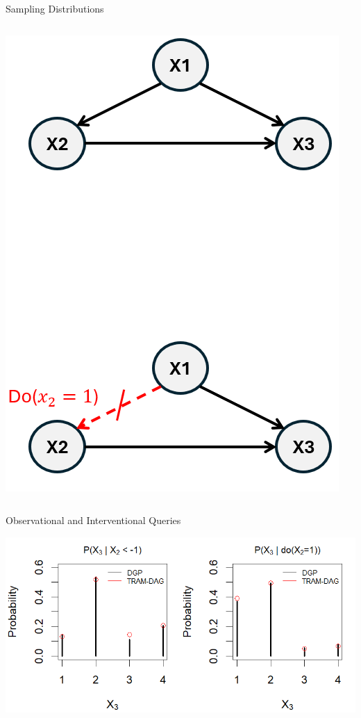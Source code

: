 \documentclass[onlytextwidth,english]{beamer}\usepackage[]{graphicx}\usepackage[]{xcolor}
\begin{document}
\begin{frame}{Sampling Distributions}
\begin{columns}
  
  \begin{column}{0.25\linewidth}
    \includegraphics[width=1\linewidth]{img/Do_sampling.png}
  \end{column}
  
\end{columns}



\end{frame}





\begin{frame}{Observational and Interventional Queries}

\includegraphics[width=1\linewidth]{img/Prob_Estimates.png}

\end{frame}
\end{document}
